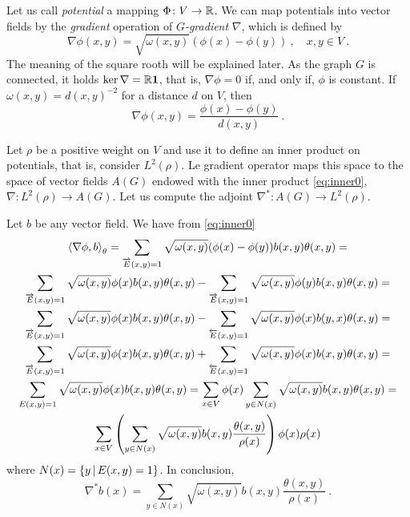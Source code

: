 \documentclass[12pt,a4paper]{amsart}
\begin{document}
Let us call \emph{potential} a mapping $\Phi \colon V \to \mathbb{R}$. We
can map potentials into vector fields by the \emph{gradient} operation
of \emph{$G$-gradient} $\nabla$, which is defined by
\begin{equation*}
  \nabla \phi(x,y) = \sqrt {\omega(x,y)} (\phi(x) - \phi(y)) \ , \quad
  x,y \in V \ .
\end{equation*}
The meaning of the square rooth will be explained later. As the graph
$G$ is connected, it holds $\ker \nabla = \mathbb{R} \bm 1$, that is,
$\nabla\phi=0$ if, and only if, $\phi$ is constant. If
$\omega(x,y) = d(x,y)^{-2}$ for a distance $d$ on $V$, then
\begin{equation*}
  \nabla \phi (x,y)=\frac{\phi(x) - \phi(y)}{d(x,y)} \ .
\end{equation*}

Let $\rho$ be a positive weight on $V$ and use it to define an inner
product on potentials, that is, consider $L^2(\rho)$. Le gradient
operator maps this space to the space of vector fields $A(G)$ endowed
with the inner product \eqref{eq:inner0}, $\nabla \colon L^2(\rho) \to A(G)$.
Let us compute the adjoint $\nabla^* \colon A(G) \to L^2(\rho)$.

Let $b$ be any vector field. We have from \cref{eq:inner0}
\begin{multline*}
  \left\langle\nabla \phi,b\right\rangle_{\theta} = \sum_{\overrightarrow E(x,y)=1}
  \sqrt{\omega(x,y)}  (\phi(x) - \phi(y)) b(x,y) \theta(x,y) = \\
  \sum_{\overrightarrow E(x,y)=1} \sqrt{\omega(x,y)} \phi(x) b(x,y)
  \theta(x,y) - \sum_{\overrightarrow E(x,y)=1}
  \sqrt{\omega(x,y)}  \phi(y) b(x,y) \theta(x,y) = \\
  \sum_{\overrightarrow E(x,y)=1} \sqrt{\omega(x,y)} \phi(x) b(x,y)
  \theta(x,y) - \sum_{\overleftarrow E(x,y)=1}
  \sqrt{\omega(x,y)}  \phi(x) b(y,x) \theta(x,y) = \\
  \sum_{\overrightarrow E(x,y)=1} \sqrt{\omega(x,y)} \phi(x) b(x,y)
  \theta(x,y) + \sum_{\overleftarrow E(x,y)=1}
  \sqrt{\omega(x,y)}  \phi(x) b(x,y) \theta(x,y) = \\
  \sum_{E(x,y)=1} \sqrt{\omega(x,y)}  \phi(x) b(x,y) \theta(x,y) = 
  \sum_{x \in V} \phi(x) \sum_{y \in N(x)}
  \sqrt{\omega(x,y)}  b(x,y) \theta(x,y) = \\
  \sum_{x \in V} \left(\sum_{y \in N(x)}
  \sqrt{\omega(x,y)}  b(x,y) \frac{\theta(x,y)}{\rho(x)} \right) \phi(x) \rho(x)
\end{multline*}
where $N(x) = \left\{y \, \middle| \, E(x,y)=1 \right\}$. In conclusion,
\begin{equation*}
  \nabla^* b(x) = \sum_{y \in N(x)}
  \sqrt{\omega(x,y)}  b(x,y) \frac{\theta(x,y)}{\rho(x)} \ .
\end{equation*}
\end{document}
